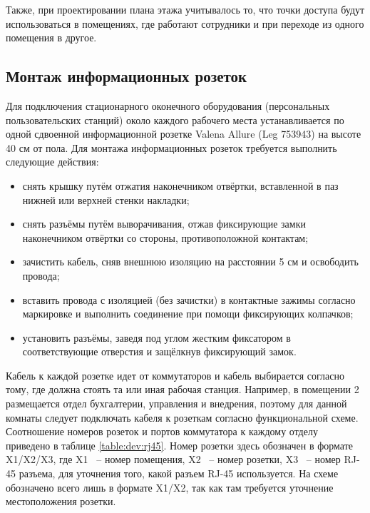 Также, при проектировании плана этажа учитывалось то, что точки доступа будут использоваться в помещениях, где работают сотрудники
и при переходе из одного помещения в другое.

\subsection{Монтаж информационных розеток}

Для подключения стационарного оконечного оборудования (персональных пользовательских станций) около каждого рабочего места устанавливается 
по одной сдвоенной информационной розетке Valena Allure (Leg 753943) на высоте 40 см от пола. Для монтажа информационных розеток 
требуется выполнить следующие действия:

\begin{itemize}
    \item снять крышку путём отжатия наконечником отвёртки, вставленной в паз нижней или верхней стенки накладки;
    \item снять разъёмы путём выворачивания, отжав фиксирующие замки наконечником отвёртки со стороны, противоположной контактам;
    \item зачистить кабель, сняв внешнюю изоляцию на расстоянии 5 см и освободить провода;
    \item вставить провода с изоляцией (без зачистки) в контактные зажимы согласно маркировке и выполнить соединение при помощи фиксирующих колпачков;
    \item установить разъёмы, заведя под углом жестким фиксатором в соответствующие отверстия и защёлкнув фиксирующий замок.
\end{itemize}

Кабель к каждой розетке идет от коммутаторов и кабель выбирается согласно тому, где должна стоять та или иная рабочая станция.
Например, в помещении 2 размещается отдел бухгалтерии, управления и внедрения, поэтому для данной комнаты следует подключать кабеля к розеткам 
согласно функциональной схеме. Соотношение номеров розеток и портов коммутатора к каждому отделу приведено в таблице \ref{table:dev:rj45}. Номер розетки 
здесь обозначен в формате X1/X2/X3, где X1 ~-- номер помещения, X2 ~-- номер розетки, X3 ~-- номер RJ-45 разъема, для уточнения того,
какой разъем RJ-45 используется. На схеме обозначено всего лишь в формате X1/X2, так как там требуется уточнение местоположения розетки.

